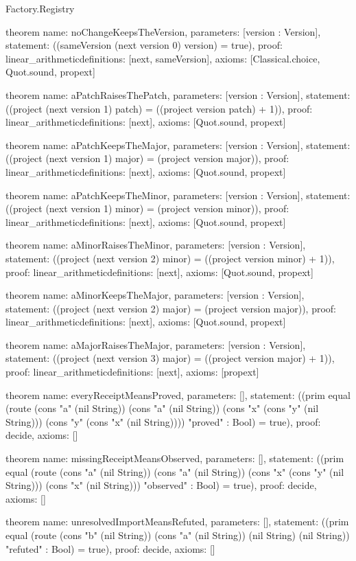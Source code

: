 \begin{lexlean}{Factory.Registry}
\begin{semanticmodule}
theorem{
  name: noChangeKeepsTheVersion,
  parameters: [version : Version],
  statement: ((sameVersion (next version 0) version) = true),
  proof: linear_arithmetic{definitions: [next, sameVersion]},
  axioms: [Classical.choice, Quot.sound, propext]
}

theorem{
  name: aPatchRaisesThePatch,
  parameters: [version : Version],
  statement: ((project (next version 1) patch) = ((project version patch) + 1)),
  proof: linear_arithmetic{definitions: [next]},
  axioms: [Quot.sound, propext]
}

theorem{
  name: aPatchKeepsTheMajor,
  parameters: [version : Version],
  statement: ((project (next version 1) major) = (project version major)),
  proof: linear_arithmetic{definitions: [next]},
  axioms: [Quot.sound, propext]
}

theorem{
  name: aPatchKeepsTheMinor,
  parameters: [version : Version],
  statement: ((project (next version 1) minor) = (project version minor)),
  proof: linear_arithmetic{definitions: [next]},
  axioms: [Quot.sound, propext]
}

theorem{
  name: aMinorRaisesTheMinor,
  parameters: [version : Version],
  statement: ((project (next version 2) minor) = ((project version minor) + 1)),
  proof: linear_arithmetic{definitions: [next]},
  axioms: [Quot.sound, propext]
}

theorem{
  name: aMinorKeepsTheMajor,
  parameters: [version : Version],
  statement: ((project (next version 2) major) = (project version major)),
  proof: linear_arithmetic{definitions: [next]},
  axioms: [Quot.sound, propext]
}

theorem{
  name: aMajorRaisesTheMajor,
  parameters: [version : Version],
  statement: ((project (next version 3) major) = ((project version major) + 1)),
  proof: linear_arithmetic{definitions: [next]},
  axioms: [propext]
}

theorem{
  name: everyReceiptMeansProved,
  parameters: [],
  statement: ((prim equal (route (cons "a" (nil String)) (cons "a" (nil String)) (cons "x" (cons "y" (nil String))) (cons "y" (cons "x" (nil String)))) "proved" : Bool) = true),
  proof: decide{},
  axioms: []
}

theorem{
  name: missingReceiptMeansObserved,
  parameters: [],
  statement: ((prim equal (route (cons "a" (nil String)) (cons "a" (nil String)) (cons "x" (cons "y" (nil String))) (cons "x" (nil String))) "observed" : Bool) = true),
  proof: decide{},
  axioms: []
}

theorem{
  name: unresolvedImportMeansRefuted,
  parameters: [],
  statement: ((prim equal (route (cons "b" (nil String)) (cons "a" (nil String)) (nil String) (nil String)) "refuted" : Bool) = true),
  proof: decide{},
  axioms: []
}
\end{semanticmodule}
\end{lexlean}
